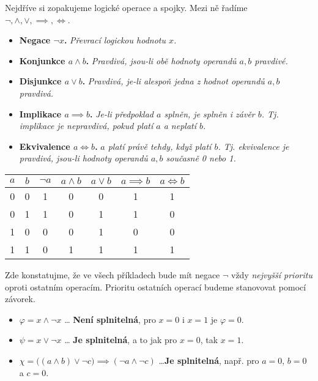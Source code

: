 Nejdříve si zopakujeme logické operace a spojky. Mezi ně řadíme $\neg, \land, \lor, \implies, \iff$.
\begin{itemize}
    \item \textbf{Negace $\neg x$.} \emph{Převrací logickou hodnotu $x$.}
    \item \textbf{Konjunkce $a\land b$.} \emph{Pravdivá, jsou-li obě hodnoty operandů $a,b$ pravdivé.}
    \item \textbf{Disjunkce $a\lor b$.} \emph{Pravdivá, je-li alespoň jedna z hodnot operandů $a,b$ pravdivá.}
    \item \textbf{Implikace $a\implies b$.} \emph{Je-li předpoklad $a$ splněn, je splněn i závěr $b$. Tj. implikace je nepravdivá, pokud platí $a$ a neplatí $b$.}
    \item \textbf{Ekvivalence $a\iff b$.} \emph{$a$ platí právě tehdy, když platí $b$. Tj. ekvivalence je pravdivá, jsou-li hodnoty operandů $a,b$ současně 0 nebo 1.}
\end{itemize}
\begin{table}[h]\label{table:logicke_operace}
    \centering
    \begin{tabular}{|c|c|c|c|c|c|c|}
    \hline
    $a$ & $b$ & $\neg a$ & $a\land b$ & $a\lor b$ & $a\implies b$ & $a\iff b$ \\ \hline
    0   & 0   & 1        & 0          & 0         & 1             & 1         \\ \hline
    0   & 1   & 1        & 0          & 1         & 1             & 0         \\ \hline
    1   & 0   & 0        & 0          & 1         & 0             & 0         \\ \hline
    1   & 1   & 0        & 1          & 1         & 1             & 1         \\ \hline
    \end{tabular}
\end{table}
Zde konstatujme, že ve všech příkladech bude mít negace $\neg$ vždy \emph{nejvyšší prioritu} oproti ostatním operacím. Prioritu ostatních operací budeme stanovovat pomocí závorek. 
\begin{example}\label{ex:sat_formule}
    \begin{itemize}
        \item $\varphi=x\land\neg x$ \dots \textbf{ Není splnitelná}, pro $x=0$ i $x=1$ je $\varphi=0$.
        \item $\psi=x\lor\neg x$ \dots \textbf{ Je splnitelná}, a to jak pro $x=0$, tak $x=1$.
        \item $\chi=\big((a\land b)\lor \neg c\big)\implies (\neg a\land\neg c)$ \dots \textbf{Je splnitelná}, např. pro $a=0$, $b=0$ a $c=0$.
    \end{itemize}
\end{example}
